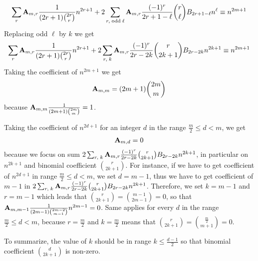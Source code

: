\begin{equation*}
    \sum_{r} {\mathbf{A}} \sb{m,r} \frac{1}{(2r+1) \binom{2r}r} n^{2r+1}
    + 2 \sum_{r, \; \mathrm{odd \; \ell}} {\mathbf{A}} \sb{m,r} \frac{(-1)^r}{2r+1-\ell} \binom{r}{\ell} {B}\sb{2r+1-\ell} n^{\ell}
    \equiv n^{2m+1}
\end{equation*}
Replacing odd $\ell$ by $k$ we get
\begin{align*}
    \sum_{r} {\mathbf{A}} \sb{m,r} \frac{1}{(2r+1) \binom{2r}r} n^{2r+1}
    + 2 \sum_{r, \; k} {\mathbf{A}} \sb{m,r} \frac{(-1)^r}{2r-2k} \binom{r}{2k+1} {B}\sb{2r-2k} n^{2k+1} \equiv n^{2m+1}
\end{align*}
Taking the coefficient of $n^{2m+1}$ we get
\begin{align*}
    {\mathbf{A}} \sb{m,m} = (2m+1)\binom{2m}{m}
\end{align*}
because ${\mathbf{A}} \sb{m,m} \frac{1}{(2m+1) \binom{2m}{m}} = 1$.

Taking the coefficient of $n^{2d+1}$ for an integer $d$ in the range $\frac{m}{2} \leq d < m$, we get
\begin{align*}
    {\mathbf{A}} \sb{m,d} = 0
\end{align*}
because we focus on sum $2 \sum_{r, \; k} {\mathbf{A}} \sb{m,r} \frac{(-1)^r}{2r-2k} \binom{r}{2k+1} {B}\sb{2r-2k} n^{2k+1}$,
in particular on $n^{2k+1}$ and binomial coefficient $\binom{r}{2k+1}$.
For instance, if we have to get coefficient of $n^{2d+1}$ in range $\frac{m}{2} \leq d < m$, we set $d=m-1$, thus
we have to get coefficient of $m-1$ in
$2 \sum_{r, \; k} {\mathbf{A}} \sb{m,r} \frac{(-1)^r}{2r-2k} \binom{r}{2k+1} {B}\sb{2r-2k} n^{2k+1}$.
Therefore, we set $k=m-1$ and $r=m-1$ which leads that $\binom{r}{2k+1}=\binom{m-1}{2m-1} = 0$, so that
${\mathbf{A}} \sb{m,m-1} \frac{1}{(2m-1) \binom{2m-2}{m-1}} n^{2m-1} = 0$.
Same applies for every $d$ in the range $\frac{m}{2} \leq d < m$, because $r=\frac{m}{2}$ and $k=\frac{m}{2}$
means that $\binom{r}{2k+1} = \binom{\frac{m}{2}}{m+1} = 0$.

To summarize, the value of $k$ should be in range $k \leq \frac{d-1}{2}$ so that binomial coefficient $\binom{d}{2k+1}$
is non-zero.

